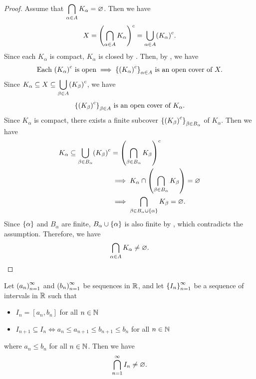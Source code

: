 \begin{proof}
    Assume that $\displaystyle \bigcap_{\alpha \in A} K_{\alpha} = \vnot$. Then we have
    \[
    X = \paren*{\bigcap_{\alpha \in A} K_{\alpha}}^{c} = \bigcup_{\alpha \in A} \paren*{K_{\alpha}}^{c}.
    \]
    Since each $K_{\alpha}$ is compact, $K_{\alpha}$ is closed by .
    Then, by , we have
    \[
    \text{Each } \paren*{K_{\alpha}}^{c} \text{ is open} \implies
    \set*{\paren*{K_{\alpha}}^{c}}_{\alpha \in A} \text{ is an open cover of } X.
    \]
    Since $K_{\alpha} \subseteq X \subseteq \displaystyle \bigcup_{\beta \in A} \paren*{K_{\beta}}^{c}$, we have
    \[
    \set*{\paren*{K_{\beta}}^{c}}_{\beta \in A} \text{ is an open cover of } K_{\alpha}.
    \]
    Since $K_{\alpha}$ is compact, there exists a finite subcover
    $\set*{\paren*{K_{\beta}}^{c}}_{\beta \in B_{\alpha}}$ of $K_{\alpha}$. Then we have
    \begin{align*}
        K_{\alpha} \subseteq \bigcup_{\beta \in B_{\alpha}} \paren*{K_{\beta}}^{c}
        &= \paren*{\bigcap_{\beta \in B_{\alpha}} K_{\beta}}^{c} \\
        &\implies K_{\alpha} \cap \paren*{\bigcap_{\beta \in B_{\alpha}} K_{\beta}} = \vnot \\
        &\implies \bigcap_{\beta \in B_{\alpha} \cup \set*{\alpha}} K_{\beta} = \vnot.
    \end{align*}
    Since $\set*{\alpha}$ and $B_{\alpha}$ are finite, $B_{\alpha} \cup \set*{\alpha}$ is also finite
    by , which contradicts the assumption. Therefore, we have
    \[
    \bigcap_{\alpha \in A} K_{\alpha} \neq \vnot.
    \]
\end{proof}

\bigskip

\begin{lemma} \label{lem:NestedIntervals}
    Let $\paren*{a_{n}}_{n = 1}^{\infty}$ and $\paren*{b_{n}}_{n = 1}^{\infty}$ be sequences in $\R$,
    and let $\set*{I_{n}}_{n = 1}^{\infty}$ be a sequence of intervals in $\R$ such that
    \begin{itemize}
        \item $I_{n} = [a_{n}, b_{n}]$ for all $n \in \N$
        \item $I_{n + 1} \subseteq I_{n} \iff a_{n} \leq a_{n + 1} \leq b_{n + 1} \leq b_{n}$ for all $n \in \N$
    \end{itemize}
    where $a_{n} \leq b_{n}$ for all $n \in \N$. Then we have
    \[
    \bigcap_{n = 1}^{\infty} I_{n} \neq \vnot.
    \]
\end{lemma}

